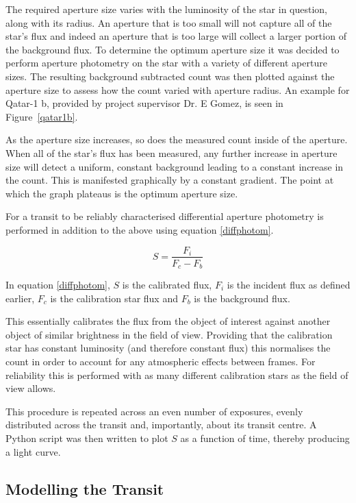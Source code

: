 \documentclass{report}
\begin{document}
The required aperture size varies with the luminosity of the star in question, along with its radius. An aperture that is too small will not capture all of the star's flux and indeed an aperture that is too large will collect a larger portion of the background flux. To determine the optimum aperture size it was decided to perform aperture photometry on the star with a variety of different aperture sizes.  The resulting background subtracted count was then plotted against the aperture size to assess how the count varied with aperture radius. An example for Qatar-1 b, provided by project supervisor Dr. E Gomez, is seen in Figure~\ref{qatar1b}.

As the aperture size increases, so does the measured count inside of the aperture. When all of the star's flux has been measured, any further increase in aperture size will detect a uniform, constant background leading to a constant increase in the count. This is manifested graphically by a constant gradient. The point at which the graph plateaus is the optimum aperture size.

For a transit to be reliably characterised differential aperture photometry is performed in addition to the above using equation \ref{diffphotom}. 

\begin{equation} \label{diffphotom}
    S = \frac{F_{i}}{F_{c}-F_{b}}
\end{equation}

In equation \ref{diffphotom}, $S$ is the calibrated flux, $F_{i}$ is the incident flux as defined earlier, $F_{c}$ is the calibration star flux and $F_{b}$ is the background flux.

This essentially calibrates the flux from the object of interest against another object of similar brightness in the field of view. Providing that the calibration star has constant luminosity (and therefore constant flux) this normalises the count in order to account for any atmospheric effects between frames. For reliability this is performed with as many different calibration stars as the field of view allows.

This procedure is repeated across an even number of exposures, evenly distributed across the transit and, importantly, about its transit centre. A Python script was then written to plot $S$ as a function of time, thereby producing a light curve.

\subsection{Modelling the Transit}
\end{document}
